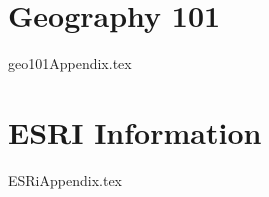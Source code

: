 
\begin{appendices}
\chapter{Geography 101}
{geo101Appendix.tex}
\chapter{ESRI Information}
{ESRiAppendix.tex}
\end{appendices}

